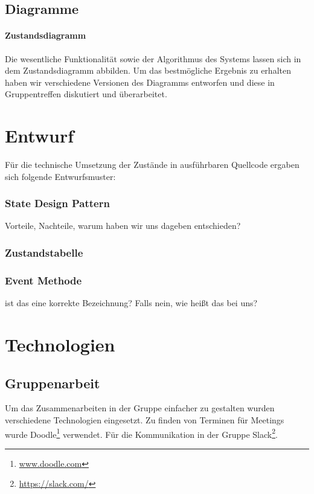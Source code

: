 \section{Diagramme}
\subsubsection{Zustandsdiagramm}
Die wesentliche Funktionalität sowie der Algorithmus des Systems lassen sich in 
dem Zustandsdiagramm abbilden. Um das bestmögliche Ergebnis zu erhalten haben 
wir verschiedene Versionen des Diagramms entworfen und diese in Gruppentreffen diskutiert und überarbeitet.
\chapter{Entwurf}
Für die technische Umsetzung der Zustände in ausführbaren Quellcode ergaben sich folgende Entwurfsmuster:
\subsection*{State Design Pattern}
Vorteile, Nachteile, warum haben wir uns dageben entschieden?
\subsection*{Zustandstabelle}
\subsection*{Event Methode}
ist das eine korrekte Bezeichnung? Falls nein, wie heißt das bei uns?
\chapter{Technologien}
\section{Gruppenarbeit}
Um das Zusammenarbeiten in der Gruppe einfacher zu gestalten wurden verschiedene Technologien eingesetzt.
Zu finden von Terminen für Meetings wurde Doodle\footnote{\url{www.doodle.com}}  verwendet. Für die Kommunikation in der Gruppe Slack\footnote{\url{https://slack.com/}}.
